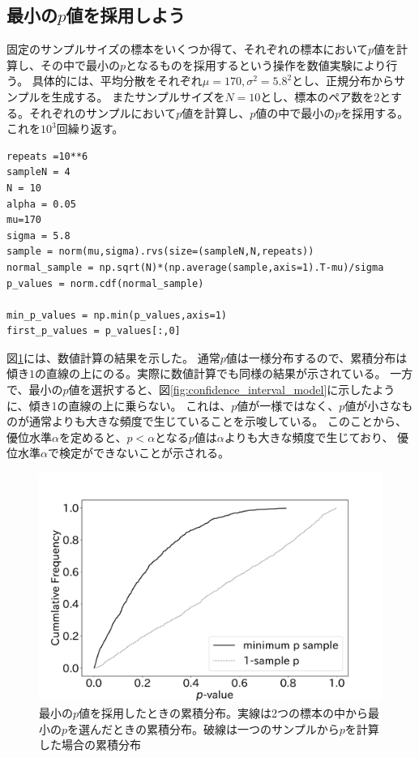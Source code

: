 \subsection{最小の$p$値を採用しよう}
固定のサンプルサイズの標本をいくつか得て、それぞれの標本において$p$値を計算し、その中で最小の$p$となるものを採用するという操作を数値実験により行う。
具体的には、平均分散をそれぞれ$\mu=170,\sigma^2=5.8^2$とし、正規分布からサンプルを生成する。
またサンプルサイズを$N=10$とし、標本のペア数を$2$とする。それぞれのサンプルにおいて$p$値を計算し、$p$値の中で最小の$p$を採用する。
これを$10^3$回繰り返す。

\begin{lstlisting}
repeats =10**6
sampleN = 4
N = 10
alpha = 0.05
mu=170
sigma = 5.8
sample = norm(mu,sigma).rvs(size=(sampleN,N,repeats)) 
normal_sample = np.sqrt(N)*(np.average(sample,axis=1).T-mu)/sigma
p_values = norm.cdf(normal_sample)

min_p_values = np.min(p_values,axis=1)
first_p_values = p_values[:,0]
\end{lstlisting}

図\ref{fig:minimum_p_value_choice}には、数値計算の結果を示した。
通常$p$値は一様分布するので、累積分布は傾き$1$の直線の上にのる。実際に数値計算でも同様の結果が示されている。
一方で、最小の$p$値を選択すると、図\ref{fig:confidence_interval_model}に示したように、傾き1の直線の上に乗らない。
これは、$p$値が一様ではなく、$p$値が小さなものが通常よりも大きな頻度で生じていることを示唆している。
このことから、優位水準$\alpha$を定めると、$p<\alpha$となる$p$値は$\alpha$よりも大きな頻度で生じており、
優位水準$\alpha$で検定ができないことが示される。

\begin{figure}
  \begin{center}
    \includegraphics[width=15cm]{./image/04_/Minimum-p-values-choice-exmepriment.pdf}
    \caption{最小の$p$値を採用したときの累積分布。実線は2つの標本の中から最小の$p$を選んだときの累積分布。破線は一つのサンプルから$p$を計算した場合の累積分布}
        \label{fig:minimum_p_value_choice}
    \end{center}
\end{figure}

